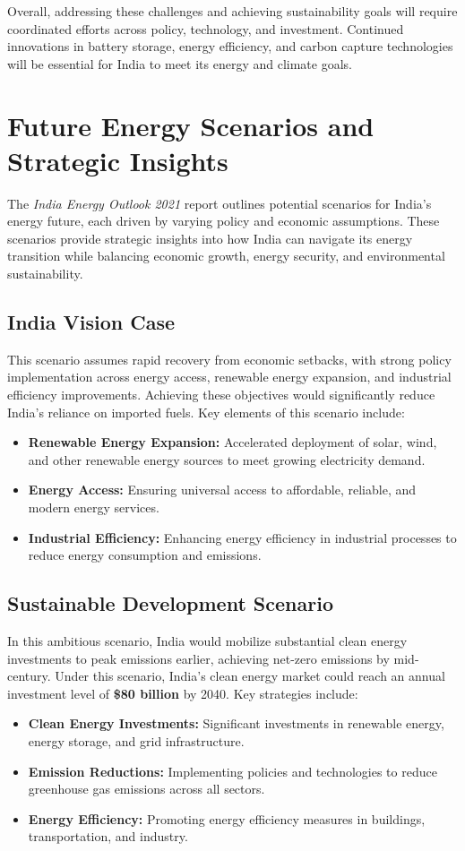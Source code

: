 \documentclass[12pt]{article}
\begin{document}
\begin{spacing}{1.5}
Overall, addressing these challenges and achieving sustainability goals will require coordinated efforts across policy, technology, and investment. Continued innovations in battery storage, energy efficiency, and carbon capture technologies will be essential for India to meet its energy and climate goals.
\section*{Future Energy Scenarios and Strategic Insights}
The \textit{India Energy Outlook 2021} report outlines potential scenarios for India's energy future, each driven by varying policy and economic assumptions. These scenarios provide strategic insights into how India can navigate its energy transition while balancing economic growth, energy security, and environmental sustainability.

\subsection*{India Vision Case}
This scenario assumes rapid recovery from economic setbacks, with strong policy implementation across energy access, renewable energy expansion, and industrial efficiency improvements. Achieving these objectives would significantly reduce India’s reliance on imported fuels. Key elements of this scenario include:
\begin{itemize}
    \item \textbf{Renewable Energy Expansion:} Accelerated deployment of solar, wind, and other renewable energy sources to meet growing electricity demand.
    \item \textbf{Energy Access:} Ensuring universal access to affordable, reliable, and modern energy services.
    \item \textbf{Industrial Efficiency:} Enhancing energy efficiency in industrial processes to reduce energy consumption and emissions.
\end{itemize}

\subsection*{Sustainable Development Scenario}
In this ambitious scenario, India would mobilize substantial clean energy investments to peak emissions earlier, achieving net-zero emissions by mid-century. Under this scenario, India’s clean energy market could reach an annual investment level of \textbf{\$80 billion} by 2040. Key strategies include:
\begin{itemize}
    \item \textbf{Clean Energy Investments:} Significant investments in renewable energy, energy storage, and grid infrastructure.
    \item \textbf{Emission Reductions:} Implementing policies and technologies to reduce greenhouse gas emissions across all sectors.
    \item \textbf{Energy Efficiency:} Promoting energy efficiency measures in buildings, transportation, and industry.
\end{itemize}


\end{spacing}
\end{document}
